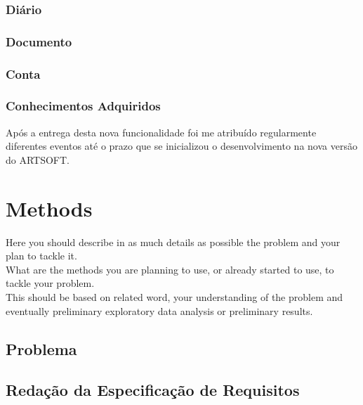 \documentclass[sigplan]{acmart}
\begin{document}
\subsubsection{Diário}

\subsubsection{Documento}

\subsubsection{Conta}

\subsubsection{Conhecimentos Adquiridos}

 Após a entrega desta nova funcionalidade foi me atribuído regularmente diferentes eventos até o prazo que se inicializou o desenvolvimento na nova versão do ARTSOFT.

\section{Methods} \label{sec:methods}

Here you should describe in as much details as possible the problem and your plan to tackle it. \\

What are the methods you are planning to use, or already started to use, to tackle your problem. \\

This should be based on related word, your understanding of the problem and eventually preliminary exploratory data analysis or preliminary results.

\subsection{Problema} %

\subsection{Redação da Especificação de Requisitos}
\end{document}
